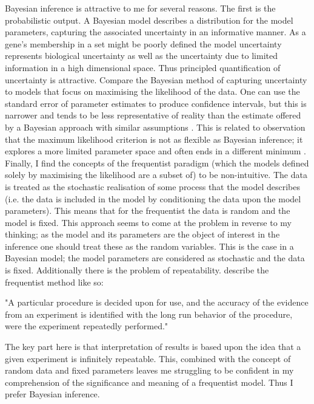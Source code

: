 \documentclass[12pt]{article} %
\begin{document}
	Bayesian inference is attractive to me for several reasons. The first is the probabilistic output. A Bayesian model describes a distribution for the model parameters, capturing the associated uncertainty in an informative manner. As a gene's membership in a set might be poorly defined \citep{Pita-JuarezPathwayCoexpressionNetwork2018} the model uncertainty represents biological uncertainty as well as the uncertainty due to limited information in a high dimensional space. Thus principled quantification of uncertainty is attractive. Compare the Bayesian method of capturing uncertainty to models that focus on maximising the likelihood of the data. One can use the standard error of parameter estimates to produce confidence intervals, but this is narrower and tends to be less representative of reality than the estimate offered by a Bayesian approach with similar assumptions \citep{PhysRevLett.122.232502}. This is related to observation that the maximum likelihood criterion is not as flexible as Bayesian inference; it explores a more limited parameter space and often ends in a different minimum \citep{PhysRevLett.122.232502, efron2013250}. Finally, I find the concepts of the frequentist paradigm (which the models defined solely by maximising the likelihood are a subset of) to be non-intuitive. The data is treated as the stochastic realisation of some process that the model describes (i.e. the data is included in the model by conditioning the data upon the model parameters). This means that for the frequentist the data is random and the model is fixed. This approach seems to come at the problem in reverse to my thinking; as the model and its parameters are the object of interest in the inference one should treat these as the random variables. This is the case in a Bayesian model; the model parameters are considered as stochastic and the data is fixed. Additionally there is the problem of repeatability. \citet[p.14]{berger1988thelikelihoodprinciple} describe the frequentist method like so:
	
	\begin{displayquote}
		"A particular procedure is decided upon for use, and the accuracy of the evidence from an experiment is identified with the long run behavior of the procedure, were the experiment repeatedly performed." 
	\end{displayquote}
	The key part here is that interpretation of results is based upon the idea that a given experiment is infinitely repeatable. This, combined with the concept of random data and fixed parameters leaves me struggling to be confident in my comprehension of the significance and meaning of a frequentist model. Thus I prefer Bayesian inference.
	
\end{document}
